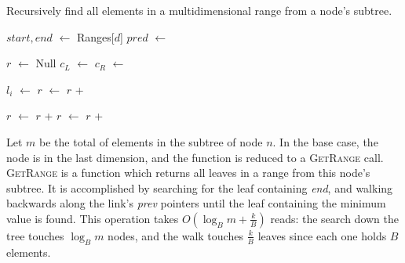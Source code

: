 \documentclass[11pt, oneside]{article}
\newcommand*\Let[2]{\State #1 $\gets$ #2}
\newcommand{\ms}{\textit}
\begin{document}
\begin{algorithm}[H]
    \caption{Recursively find all elements in a multidimensional range from a
        node's subtree.}
    \begin{algorithmic}[1]
        \Statex
            \Let{$start, end$}{Ranges[$d$]}
                \Let{$pred$}{}
                \State \Return{}
            \EndIf
            
            \State
            \Let{$r$}{Null}
            \Let{$c_L$}{}
            \Let{$c_R$}{}
            \State {}
            \State

                \State {}
                \Let{$l_i$}{}
                \Let{$r$}{$r$ + }
            \EndFor

            \State
            \State {}
            
            \Let{$r$}{$r$ + }
            \Let{$r$}{$r$ + }

            \State {}
        \EndFunction
        \end{algorithmic}
\end{algorithm}

Let $m$ be the total of elements in the subtree of node $n$. In the base case,
the node is in the last dimension, and the function is reduced to a
\textsc{GetRange} call. \textsc{GetRange} is a function which returns all leaves
in a range from this node's subtree. It is accomplished by searching for the leaf
containing \ms{end}, and walking backwards along the link's \ms{prev} pointers
until the leaf containing the minimum value is found. This operation takes
$O(\log_B m + \frac{k}{B})$ reads: the search down the tree touches $\log_B m$
nodes, and the walk touches $\frac{k}{B}$ leaves since each one holds $B$
elements.
\end{document}
